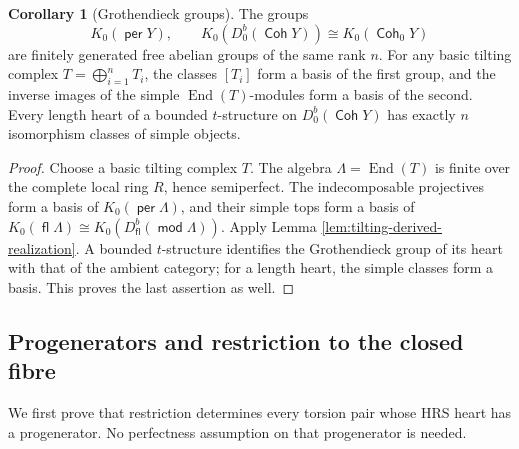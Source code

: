 \documentclass[a4paper,reqno]{amsart}
\DeclareMathOperator{\md}{\mathsf{mod}}
\renewcommand{\mod}{\md}
\DeclareMathOperator{\fl}{\mathsf{fl}}
\DeclareMathOperator{\Coh}{\mathsf{Coh}}
\DeclareMathOperator{\per}{\mathsf{per}}
\DeclareMathOperator{\End}{End}
\theoremstyle{definition}
\newtheorem{Cor}[Thm]{Corollary}
\begin{document}
\begin{Cor}[Grothendieck groups]\label{cor:grothendieck-groups}
The groups
\[
K_0(\per Y),\qquad
K_0(D^b_0(\Coh Y))\cong K_0(\Coh_0Y)
\]
are finitely generated free abelian groups of the same rank $n$. For any basic tilting complex $T=\bigoplus_{i=1}^nT_i$, the classes $[T_i]$ form a basis of the first group, and the inverse images of the simple $\End(T)$-modules form a basis of the second. Every length heart of a bounded $t$-structure on $D^b_0(\Coh Y)$ has exactly $n$ isomorphism classes of simple objects.
\end{Cor}
\begin{proof}
Choose a basic tilting complex $T$. The algebra $\Lambda=\End(T)$ is finite over the complete local ring $R$, hence semiperfect. The indecomposable projectives form a basis of $K_0(\per\Lambda)$, and their simple tops form a basis of $K_0(\fl\Lambda)\cong K_0(D^b_{\fl}(\mod\Lambda))$. Apply Lemma \ref{lem:tilting-derived-realization}. A bounded $t$-structure identifies the Grothendieck group of its heart with that of the ambient category; for a length heart, the simple classes form a basis. This proves the last assertion as well.
\end{proof}

\subsection{Progenerators and restriction to the closed fibre}

We first prove that restriction determines every torsion pair whose HRS heart has a progenerator. No perfectness assumption on that progenerator is needed.
\end{document}
